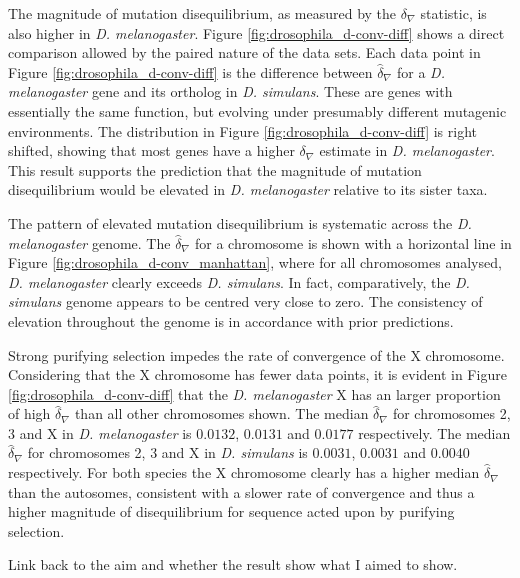 The magnitude of mutation disequilibrium, as measured by the $\delta_\nabla$  statistic, is also higher in \textit{D. melanogaster}. Figure \ref{fig:drosophila_d-conv-diff} shows a direct comparison allowed by the paired nature of the data sets. Each data point in Figure \ref{fig:drosophila_d-conv-diff} is the difference between $\hat \delta_\nabla$ for a \textit{D. melanogaster} gene and its ortholog in \textit{D. simulans}. These are genes with essentially the same function, but evolving under presumably different mutagenic environments. The distribution in Figure \ref{fig:drosophila_d-conv-diff} is right shifted, showing that most genes have a higher $\delta_\nabla$ estimate in \textit{D. melanogaster}. This result supports the prediction that the magnitude of mutation disequilibrium would be elevated in \textit{D. melanogaster} relative to its sister taxa. 



The pattern of elevated mutation disequilibrium is systematic across the \textit{D. melanogaster} genome. The $\hat \delta_\nabla$ for a chromosome is shown with a horizontal line in Figure \ref{fig:drosophila_d-conv_manhattan}, where for all chromosomes analysed, \textit{D. melanogaster} clearly exceeds \textit{D. simulans}. In fact, comparatively, the \textit{D. simulans} genome appears to be centred very close to zero. The consistency of elevation throughout the genome is in accordance with prior predictions.

Strong purifying selection impedes the rate of convergence of the X chromosome. Considering that the X chromosome has fewer data points, it is evident in Figure \ref{fig:drosophila_d-conv-diff} that the \textit{D. melanogaster} X has an larger proportion of high $\hat \delta_\nabla$ than all other chromosomes shown. The median $\hat \delta_\nabla$ for chromosomes 2, 3 and X in \textit{D. melanogaster} is $0.0132$, $0.0131$ and $0.0177$ respectively. The median $\hat \delta_\nabla$ for chromosomes 2, 3 and X in \textit{D. simulans} is $0.0031$, $0.0031$ and $0.0040$ respectively. For both species the X chromosome clearly has a higher median $\hat \delta_\nabla$ than the autosomes, consistent with a slower rate of convergence and thus a higher magnitude of disequilibrium for sequence acted upon by purifying selection. 



Link back to the aim and whether the result show what I aimed to show. 

